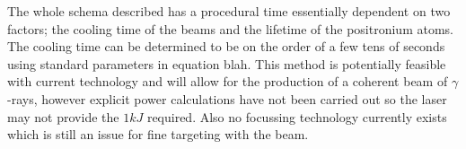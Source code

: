 \newline
\newline
The whole schema described has a procedural time essentially dependent on two factors; the cooling time of the beams and the lifetime of the positronium atoms. The cooling time can be determined to be on the order of a few tens of seconds using standard parameters in equation blah.
\newline
\newline
This method is potentially feasible with current technology and will allow for the production of a coherent beam of $\gamma$-rays, however explicit power calculations have not been carried out so the laser may not provide the $1kJ$ required. Also no focussing technology currently exists which is still an issue for fine targeting with the beam.

